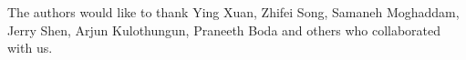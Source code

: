 The authors would like to thank Ying Xuan, Zhifei Song, Samaneh Moghaddam, Jerry Shen, Arjun Kulothungun, Praneeth Boda and others who collaborated with us.